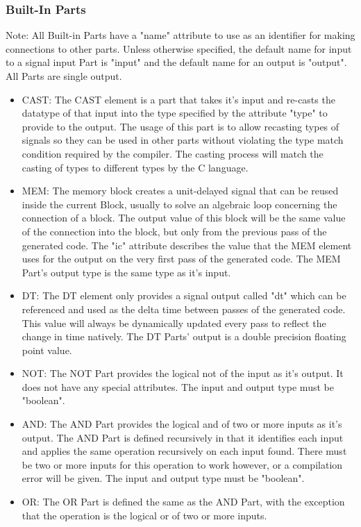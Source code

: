 \documentclass[titlepage]{article}
\begin{document}
\subsubsection{Built-In Parts}
Note: All Built-in Parts have a "name" attribute to use as an identifier for making connections to other parts. Unless otherwise specified, the default name for input to a signal input Part is "input" and the default name for an output is "output". All Parts are single output.
\begin{itemize}[label={}]
    \item CAST:
The CAST element is a part that takes it's input and re-casts the datatype of that input into the type specified by the attribute "type" to provide to the output.
The usage of this part is to allow recasting types of signals so they can be used in other parts without violating the type match condition required by the compiler.
The casting process will match the casting of types to different types by the C language.
    \item MEM:
The memory block creates a unit-delayed signal that can be reused inside the current Block, usually to solve an algebraic loop concerning the connection of a block.
The output value of this block will be the same value of the connection into the block, but only from the previous pass of the generated code.
The "ic" attribute describes the value that the MEM element uses for the output on the very first pass of the generated code.
The MEM Part's output type is the same type as it's input.
    \item DT:
The DT element only provides a signal output called "dt" which can be referenced and used as the delta time between passes of the generated code.
This value will always be dynamically updated every pass to reflect the change in time natively.
The DT Parts' output is a double precision floating point value.
    \item NOT:
The NOT Part provides the logical not of the input as it's output.
It does not have any special attributes.
The input and output type must be "boolean".
    \item AND:
The AND Part provides the logical and of two or more inputs as it's output.
The AND Part is defined recursively in that it identifies each input and applies the same operation recursively on each input found.
There must be two or more inputs for this operation to work however, or a compilation error will be given.
The input and output type must be "boolean".
    \item OR:
The OR Part is defined the same as the AND Part, with the exception that the operation is the logical or of two or more inputs.

\end{itemize}
\end{document}
